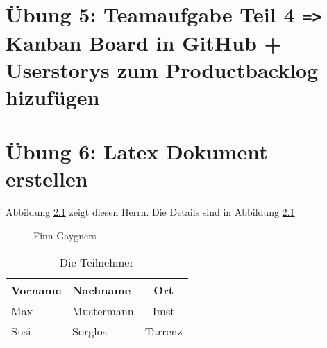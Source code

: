 \documentclass[ngerman]{report}
\begin{document}
    \chapter{Übung 5: Teamaufgabe Teil 4 \texttt{=>} Kanban Board in GitHub + Userstorys zum Productbacklog hizufügen}
    \chapter{Übung 6: Latex Dokument erstellen}
    

    Abbildung \ref{fig:portrait} zeigt diesen Herrn.
    Die Details sind in Abbildung \ref{tab:teilnehmer}
    
    \begin{figure}[h]
        \centering
       
        \caption{Finn Gaygners}
        \label{fig:portrait}
    \end{figure}
    
    \begin{table}[h]
        \begin{center}
            \begin{tabular}{ l  l | c }
             Vorname & Nachname & Ort \\
             \hline
             Max & Mustermann & Imst \\  
             Susi & Sorglos & Tarrenz    
            \end{tabular}
        \end{center}
        \caption{Die Teilnehmer}
        \label{tab:teilnehmer}
    \end{table}
 
\end{document}
